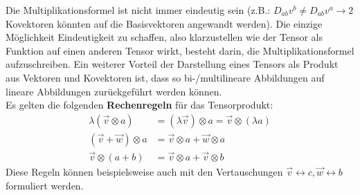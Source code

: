 	  Die Multiplikationsformel ist nicht immer eindeutig sein (z.B.: $D_{ab}v^b\neq D_{ab}v^a \to 2$ Kovektoren könnten auf die Basisvektoren angewandt werden). Die einzige Möglichkeit Eindeutigkeit zu schaffen, also klarzustellen wie der Tensor als Funktion auf einen anderen Tensor wirkt, besteht darin, die Multiplikationsformel aufzuschreiben. Ein weiterer Vorteil der Darstellung eines Tensors als Produkt aus Vektoren und Kovektoren ist, dass so bi-/multilineare Abbildungen auf lineare Abbildungen zurückgeführt werden können.\\
	  Es gelten die folgenden \textbf{Rechenregeln} für das Tensorprodukt:
	  \begin{equation}\label{regelntens}
	  	\begin{split}
	  		\lambda (\vec{v}\otimes a) &= (\lambda \vec{v})\otimes a=\vec{v}\otimes (\lambda a)\\
	  		(\vec{v}+\vec{w})\otimes a &= \vec{v}\otimes a + \vec{w}\otimes a\\
	  		\vec{v}\otimes (a+b) &= \vec{v}\otimes a + \vec{v}\otimes b
	  	\end{split}
	  \end{equation}
	  Diese Regeln können beispielsweise auch mit den Vertauschungen $\vec{v}\leftrightarrow c, \vec{w}\leftrightarrow b$ formuliert werden. 
	  
